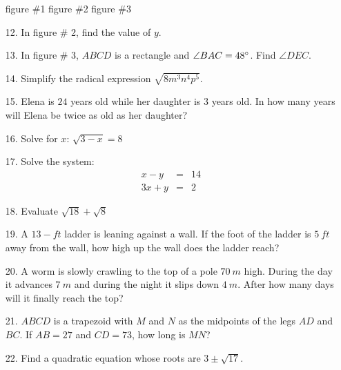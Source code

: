 \documentclass[12pt,letterpaper]{article}
\begin{document}
\begin{enumerate}
\hspace{3cm} figure \#1 \hspace{2.5cm} figure \#2\hspace{2.5cm}   figure \#3
\item [\underline{\hspace{1.3cm}}12.]In figure \# 2, find the value of $y$.
\item [\underline{\hspace{1.3cm}}13.]In figure \# 3, $ABCD$ is a rectangle and $\angle BAC=48\degree$. Find $\angle DEC$. 
\item 	[\underline{\hspace{1.3cm}}14.]Simplify the radical expression $\sqrt{8m^3n^4p^5}$.
\item[\underline{\hspace{1.3cm}}15.] Elena is $24$ years old while her daughter is $3$ years old. In how many years will Elena be twice as old as her daughter?
\item [\underline{\hspace{1.3cm}}16.]Solve for $x$: $\sqrt{3-x}=8$
\item [\underline{\hspace{1.3cm}}17.]Solve the system: 
\begin{eqnarray*}
x-y&=&14\\
3x+y&=&2
\end{eqnarray*}
\item [\underline{\hspace{1.3cm}}18.]Evaluate $\sqrt{18}+\sqrt{8}$
\item [\underline{\hspace{1.3cm}}19.]A $13-ft$ ladder is leaning against a wall. If the foot of the ladder is $5\ ft$ away from the wall, how high up the wall does the ladder reach?
\item [\underline{\hspace{1.3cm}}20.]A worm is slowly crawling to the top of a pole $70\ m$ high. During the day it advances $7\ m$ and during the night it slips down $4\ m$. After how many days will it finally reach the top?				
\item [\underline{\hspace{1.3cm}}21.]$ABCD$ is a trapezoid with $M$ and $N$ as the midpoints of the legs $AD$ and $BC$. If $AB=27$ and $CD=73$, how long is $MN$? 
\item [\underline{\hspace{1.3cm}}22.]Find a quadratic equation whose roots are $3\pm \sqrt{17}$.	

\end{enumerate}
\end{document}
